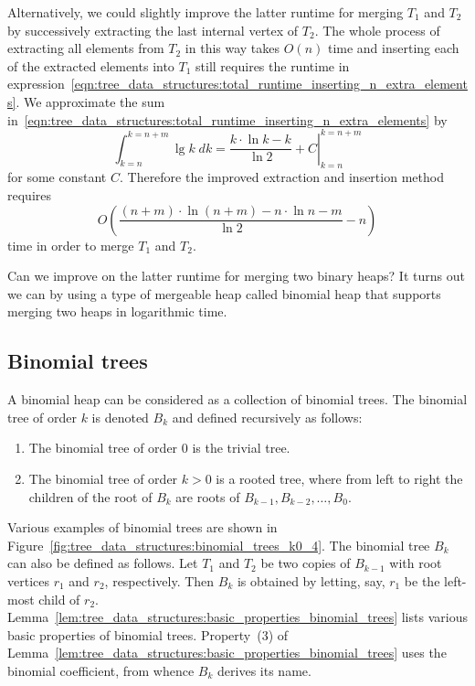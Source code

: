 Alternatively, we could slightly improve the latter runtime for
merging $T_1$ and $T_2$ by successively extracting the last internal
vertex of $T_2$. The whole process of extracting all elements from
$T_2$ in this way takes $O(n)$ time and inserting each of the
extracted elements into $T_1$ still requires the runtime in
expression~\eqref{eqn:tree_data_structures:total_runtime_inserting_n_extra_elements}.
We approximate the sum
in~\eqref{eqn:tree_data_structures:total_runtime_inserting_n_extra_elements}
by
\[
\int_{k=n}^{k=n+m} \lg k \; dk
=
\left. \frac{k \cdot \ln k - k} {\ln 2} + C \right|_{k=n}^{k=n+m}
\]
for some constant $C$. Therefore the improved extraction and
insertion method requires
\[
O\left(
\frac{(n+m) \cdot \ln(n+m) - n \cdot \ln n - m} {\ln 2} - n
\right)
\]
time in order to merge $T_1$ and $T_2$.

Can we improve on the latter runtime for merging two binary heaps? It
turns out we can by using a type of mergeable heap called
binomial heap that supports merging two heaps in
logarithmic time.



\subsection{Binomial trees}

A binomial heap can be considered as a collection of binomial
trees. The binomial tree of order $k$ is denoted $B_k$ and defined
recursively as follows:
\begin{enumerate}
\item The binomial tree of order $0$ is the trivial tree.

\item The binomial tree of order $k > 0$ is a rooted tree, where from
  left to right the children of the root of $B_k$ are roots of
  $B_{k-1}, B_{k-2}, \dots, B_0$.
\end{enumerate}
Various examples of binomial trees are shown in
Figure~\ref{fig:tree_data_structures:binomial_trees_k0_4}. The
binomial tree $B_k$ can also be defined as follows. Let $T_1$ and
$T_2$ be two copies of $B_{k-1}$ with root vertices $r_1$ and $r_2$,
respectively. Then $B_k$ is obtained by letting, say, $r_1$ be the
left-most child of $r_2$.
Lemma~\ref{lem:tree_data_structures:basic_properties_binomial_trees}
lists various basic properties of binomial trees. Property~(3) of
Lemma~\ref{lem:tree_data_structures:basic_properties_binomial_trees}
uses the binomial coefficient, from whence
$B_k$ derives its name.

